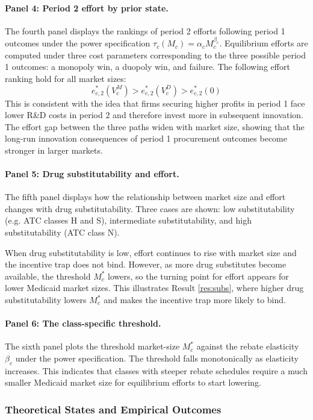\documentclass[12pt]{article}
\begin{document}
\paragraph{Panel 4: Period 2 effort by prior state.}
The fourth panel displays the rankings of period 2 efforts following period 1 outcomes under the power specification $\tau_c(M_c)=\alpha_c M_c^{\beta_c}$. Equilibrium efforts are computed under three cost parameters corresponding to the three possible period 1 outcomes: a monopoly win, a duopoly win, and failure. The following effort ranking hold for all market sizes:
\[
e_{c,2}^*(V_c^M) > e_{c,2}^*(V_c^D) > e_{c,2}^*(0)
\]
This is consistent with the idea that firms securing higher profits in period 1 face lower R\&D costs in period 2 and therefore invest more in subsequent innovation. The effort gap between the three paths widen with market size, showing that the long-run innovation consequences of period 1 procurement outcomes become stronger in larger markets.

\paragraph{Panel 5: Drug substitutability and effort.}
The fifth panel displays how the relationship between market size and effort changes with drug substitutability. Three cases are shown: low substitutability (e.g. ATC classes H and S), intermediate substitutability, and high substitutability (ATC class N).

When drug substitutability is low, effort continues to rise with market size and the incentive trap does not bind. However, as more drug substitutes become available, the threshold $M_c^*$ lowers, so the turning point for effort appears for lower Medicaid market sizes. This illustrates Result \ref{res:subs}, where higher drug substitutability lowers $M_c^*$ and makes the incentive trap more likely to bind.

\paragraph{Panel 6: The class-specific threshold.}
The sixth panel plots the threshold market-size $M_c^*$ against the rebate elasticity $\beta_c$ under the power specification. The threshold falls monotonically as elasticity increases. This indicates that classes with steeper rebate schedules require a much smaller Medicaid market size for equilibrium efforts to start lowering.

\subsubsection{Theoretical States and Empirical Outcomes}
\end{document}
